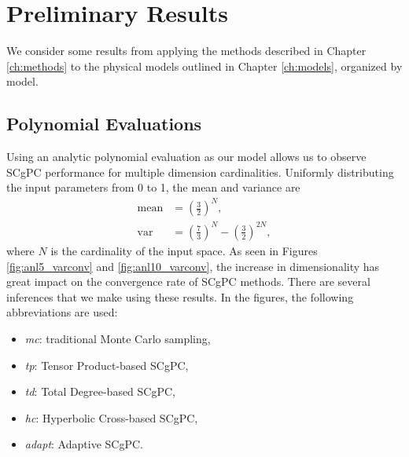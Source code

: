 
\chapter{Preliminary Results} %

\label{ch:results} %


We consider some results from applying the methods described in Chapter \ref{ch:methods} to the physical
models outlined in Chapter \ref{ch:models}, organized by model.

\section{Polynomial Evaluations}
Using an analytic polynomial evaluation as our model allows us to observe SCgPC performance for
multiple dimension cardinalities.  Uniformly distributing the input parameters from 0 to 1, the mean and variance are
\begin{align}
  \text{mean}&=\left(\frac{3}{2}\right)^N,\\
  \text{var}&=\left(\frac{7}{3}\right)^N-\left(\frac{3}{2}\right)^{2N},
\end{align}
where $N$ is the cardinality of the input space.  As seen in Figures \ref{fig:anl5_varconv} and
\ref{fig:anl10_varconv}, the increase in dimensionality has great impact on the convergence rate of SCgPC
methods.  There are several
inferences that we make using these results. In the figures, the following abbreviations are used:
\begin{itemize}
  \item \emph{mc}: traditional Monte Carlo sampling,
  \item \emph{tp}: Tensor Product-based SCgPC,
  \item \emph{td}: Total Degree-based SCgPC,
  \item \emph{hc}: Hyperbolic Cross-based SCgPC,
  \item \emph{adapt}: Adaptive SCgPC.
\end{itemize}

